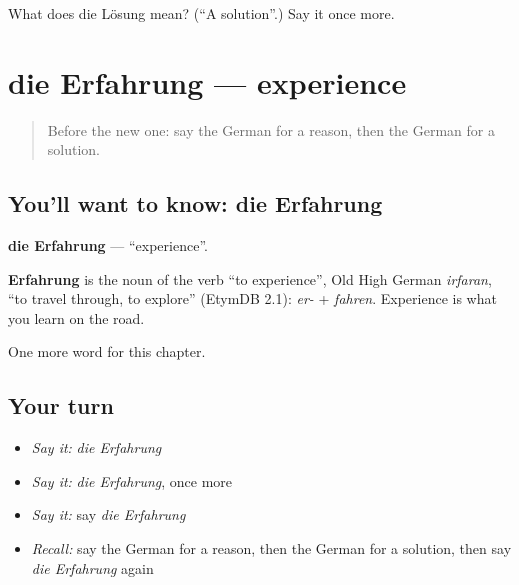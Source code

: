 \begin{tcolorbox}[breakable,colback=teal!4,colframe=teal!35!black,title={Before you move on}]
What does die Lösung mean? (\textquotedblleft{}A solution\textquotedblright{}.) Say it once more.
\end{tcolorbox}
\section[die Erfahrung]{die Erfahrung — experience}

\label{lesson:GE-C166-erfahrung}



\begin{quote}
Before the new one: say the German for a reason, then the German for a solution.
\end{quote}

\subsection*{You'll want to know: die Erfahrung}
\textbf{die Erfahrung} — \textquotedblleft{}experience\textquotedblright{}.

\begin{cousinweb}
\textbf{Erfahrung} is the noun of the verb \textquotedblleft{}to experience\textquotedblright{}, Old High German \emph{irfaran}, \textquotedblleft{}to travel through, to explore\textquotedblright{} (EtymDB 2.1): \emph{er-} + \emph{fahren}. Experience is what you learn on the road.
\end{cousinweb}

\begin{grammarlens}[title={What you've built}]
One more word for this chapter.
\end{grammarlens}

\subsection*{Your turn}
\begin{itemize}
\raggedright
  \item \emph{Say it:} \emph{die Erfahrung}
  \item \emph{Say it:} \emph{die Erfahrung}, once more
  \item \emph{Say it:} say \emph{die Erfahrung}
  \item \emph{Recall:} say the German for a reason, then the German for a solution, then say \emph{die Erfahrung} again
\end{itemize}

